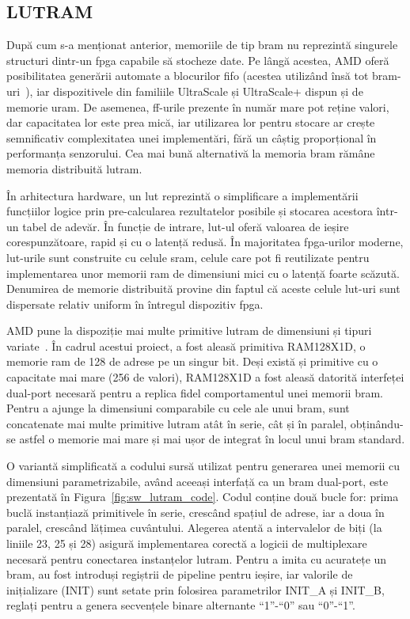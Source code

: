 \documentclass[12pt,a4paper]{report}
\begin{document}
\subsection{LUTRAM}%
\label{lutram}
După cum s-a menționat anterior, memoriile de tip \gls{bram} nu reprezintă singurele structuri dintr-un \gls{fpga} capabile să stocheze date. Pe lângă acestea, AMD oferă posibilitatea generării automate a blocurilor \gls{fifo} (acestea utilizând însă tot \gls{bram}-uri~\cite{ug473}), iar dispozitivele din familiile UltraScale și UltraScale+ dispun și de memorie \gls{uram}. De asemenea, \gls{ff}-urile prezente în număr mare pot reține valori, dar capacitatea lor este prea mică, iar utilizarea lor pentru stocare ar crește semnificativ complexitatea unei implementări, fără un câștig proporțional în performanța senzorului. Cea mai bună alternativă la memoria \gls{bram} rămâne memoria distribuită \gls{lutram}.

În arhitectura hardware, un \acrfull{lut} reprezintă o simplificare a implementării funcțiilor logice prin pre-calcularea rezultatelor posibile și stocarea acestora într-un tabel de adevăr. În funcție de intrare, \gls{lut}-ul oferă valoarea de ieșire corespunzătoare, rapid și cu o latență redusă. În majoritatea \gls{fpga}-urilor moderne, \gls{lut}-urile sunt construite cu celule \gls{sram}, celule care pot fi reutilizate pentru implementarea unor memorii \gls{ram} de dimensiuni mici cu o latență foarte scăzută. Denumirea de memorie distribuită provine din faptul că aceste celule \gls{lut}-uri sunt dispersate relativ uniform în întregul dispozitiv \gls{fpga}.

AMD pune la dispoziție mai multe primitive \gls{lutram} de dimensiuni și tipuri variate~\cite{ug953}. În cadrul acestui proiect, a fost aleasă primitiva RAM128X1D, o memorie \gls{ram} de 128 de adrese pe un singur bit. Deși există și primitive cu o capacitate mai mare (256 de valori), RAM128X1D a fost aleasă datorită interfeței dual-port necesară pentru a replica fidel comportamentul unei memorii \gls{bram}. Pentru a ajunge la dimensiuni comparabile cu cele ale unui \gls{bram}, sunt concatenate mai multe primitive \gls{lutram} atât în serie, cât și în paralel, obținându-se astfel o memorie mai mare și mai ușor de integrat în locul unui \gls{bram} standard.

O variantă simplificată a codului sursă utilizat pentru generarea unei memorii cu dimensiuni parametrizabile, având aceeași interfață ca un \gls{bram} dual-port, este prezentată în Figura~\ref{fig:sw_lutram_code}. Codul conține două bucle for: prima buclă instanțiază primitivele în serie, crescând spațiul de adrese, iar a doua în paralel, crescând lățimea cuvântului. Alegerea atentă a intervalelor de biți (la liniile 23, 25 și 28) asigură implementarea corectă a logicii de multiplexare necesară pentru conectarea instanțelor \gls{lutram}. Pentru a imita cu acuratețe un \gls{bram}, au fost introduși regiștrii de pipeline pentru ieșire, iar valorile de inițializare (INIT) sunt setate prin folosirea parametrilor INIT\_A și INIT\_B, reglați pentru a genera secvențele binare alternante \enquote{1}-\enquote{0} sau \enquote{0}-\enquote{1}.
\end{document}
